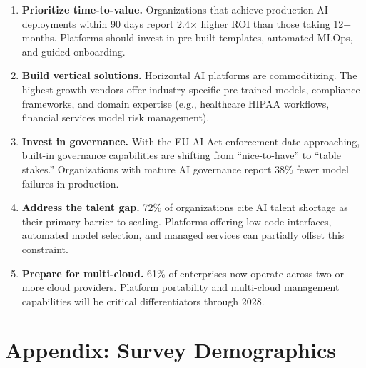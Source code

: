 \documentclass[
    language=english,
    doctype=market-analysis,
    institution=none,
]{../../omnilatex}
\begin{document}
\begin{enumerate}
    \item \textbf{Prioritize time-to-value.} Organizations that achieve
        production AI deployments within 90 days report 2.4$\times$ higher
        ROI than those taking 12+ months. Platforms should invest in
        pre-built templates, automated MLOps, and guided onboarding.

    \item \textbf{Build vertical solutions.} Horizontal AI platforms are
        commoditizing. The highest-growth vendors offer industry-specific
        pre-trained models, compliance frameworks, and domain expertise
        (e.g., healthcare HIPAA workflows, financial services model
        risk management).

    \item \textbf{Invest in governance.} With the EU AI Act enforcement
        date approaching, built-in governance capabilities are shifting
        from ``nice-to-have'' to ``table stakes.'' Organizations with
        mature AI governance report 38\% fewer model failures in
        production.

    \item \textbf{Address the talent gap.} 72\% of organizations cite
        AI talent shortage as their primary barrier to scaling. Platforms
        offering low-code interfaces, automated model selection, and
        managed services can partially offset this constraint.

    \item \textbf{Prepare for multi-cloud.} 61\% of enterprises now
        operate across two or more cloud providers. Platform portability
        and multi-cloud management capabilities will be critical
        differentiators through 2028.
\end{enumerate}

\section{Appendix: Survey Demographics}
\end{document}
